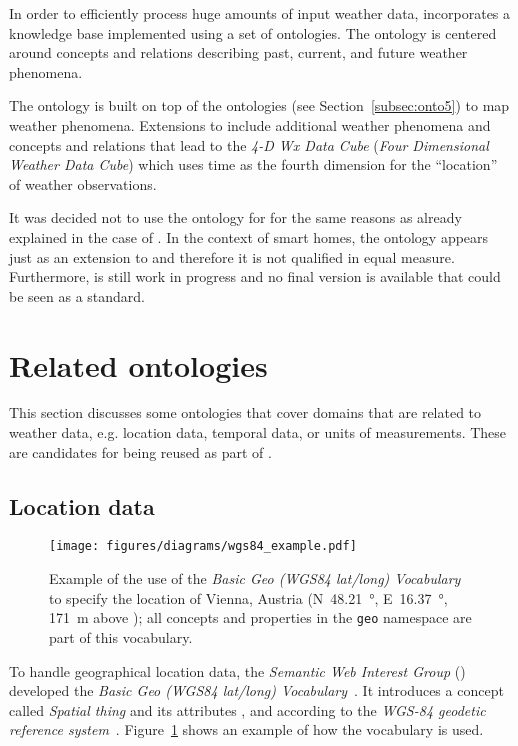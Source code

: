 In order to efficiently process huge amounts of input weather data,  incorporates a knowledge base implemented using a set of ontologies. The  ontology is centered around concepts and relations describing past, current, and future weather phenomena.

The  ontology is built on top of the  ontologies (see Section~\ref{subsec:onto5}) to map weather phenomena. Extensions to  include additional weather phenomena and concepts and relations that lead to the \emph{4-D Wx Data Cube} (\emph{Four Dimensional Weather Data Cube}) which uses time as the fourth dimension for the ``location'' of weather observations.

It was decided not to use the  ontology for \smarthomeweather for the same reasons as already explained in the case of . In the context of smart homes, the  ontology appears just as an extension to  and therefore it is not qualified in equal measure. Furthermore,  is still work in progress and no final version is available that could be seen as a standard.

\section{Related ontologies}
\label{sec:related_ontologies}

This section discusses some ontologies that cover domains that are related to weather data, e.g. location data, temporal data, or units of measurements. These are candidates for being reused as part of \smarthomeweather.

\subsection{Location data}
\label{subsec:location_ontologies}

\begin{figure}
\centering
\texttt{[image: figures/diagrams/wgs84\_example.pdf]}
\caption{Example of the use of the \emph{Basic Geo (WGS84 lat/long) Vocabulary} to specify the location of Vienna, Austria (N~\SI{48.21}{\degree}, E~\SI{16.37}{\degree}, \SI{171}{\metre} above ); all concepts and properties in the \texttt{geo} namespace are part of this vocabulary.}
\label{fig:wgs84_example}
\end{figure}

To handle geographical location data, the \emph{ Semantic Web Interest Group} () developed the \emph{Basic Geo (WGS84 lat/long) Vocabulary}~\cite{wgs84_vocabulary}. It introduces a concept called \emph{Spatial thing} and its attributes ,  and  according to the \emph{WGS-84 geodetic reference system}~\cite{WGS84}. Figure~\ref{fig:wgs84_example} shows an example of how the vocabulary is used.

